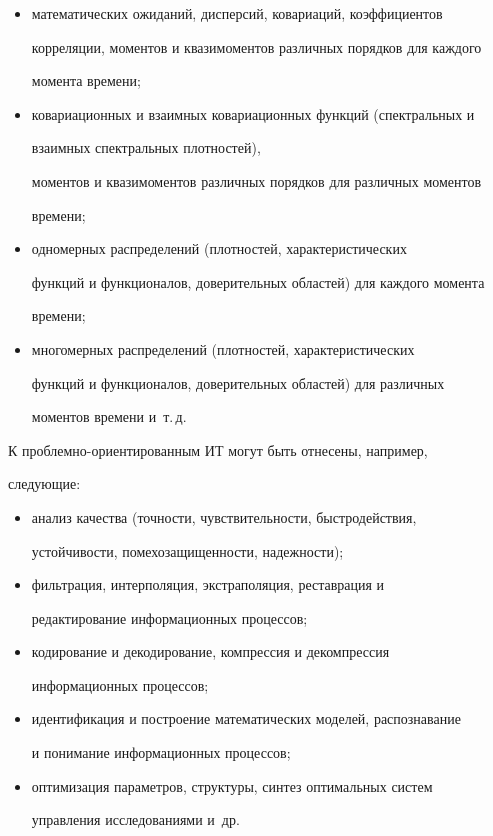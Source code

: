 \begin{itemize}


\item  математических ожиданий, дисперсий, ковариаций, коэффициентов


корреляции, моментов и квазимоментов различных порядков для каждого


момента времени;


\item  ковариационных и взаимных ковариационных функций (спектральных и


взаимных спектральных плотностей),


моментов и квазимоментов различных порядков для различных моментов


времени;


\item  одномерных распределений (плотностей, характеристических


функций и функционалов, доверительных областей) для каждого момента


времени;


\item  многомерных распределений (плотностей, характеристических


функций и функционалов, доверительных областей) для различных


моментов времени и~т.\,д.


\end{itemize}





К проблемно-ориентированным ИТ могут быть отнесены, например,


следующие:


\begin{itemize}


\item  анализ качества (точности, чувствительности, быстродействия,


устой\-чи\-вости, помехозащищенности, надежности);


\item  фильтрация, интерполяция, экстраполяция, реставрация и


редактирование информационных процессов;


\item  кодирование и декодирование, компрессия и декомпрессия


информационных процессов;


\item  идентификация и построение математических моделей, распознавание


и понимание информационных процессов;


\item  оптимизация параметров, структуры, синтез оптимальных систем


управления исследованиями и~др.


\end{itemize}





